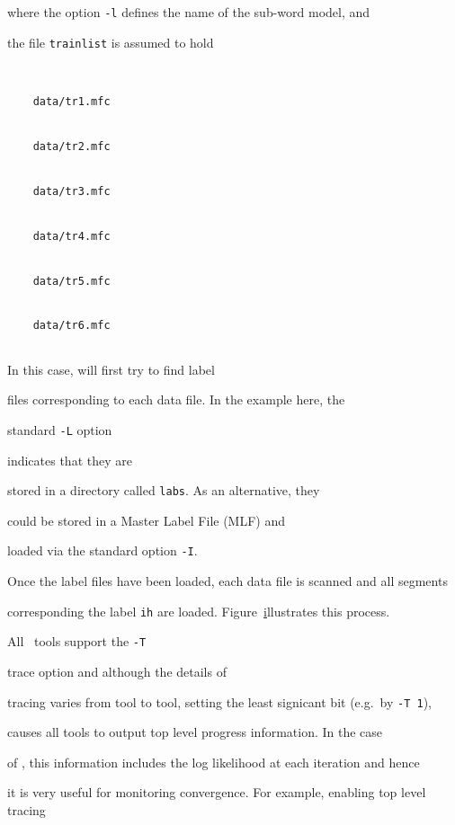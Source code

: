 where the option \texttt{-l} defines the name of the sub-word model, and 


the file \texttt{trainlist} is assumed to hold


\begin{verbatim}


    data/tr1.mfc


    data/tr2.mfc


    data/tr3.mfc


    data/tr4.mfc


    data/tr5.mfc


    data/tr6.mfc


\end{verbatim}


In this case,   will first try to find label




files corresponding to each data file.  In the example here, the 


standard \texttt{-L} option 


indicates that they are


stored in a directory called \texttt{labs}.  As an alternative, they


could be stored in a Master Label File (MLF) and 


loaded via the standard option \texttt{-I}.


Once the label files have been loaded, each data file is scanned and all segments


corresponding the label \texttt{ih} are loaded.  Figure~\href{f:hinitdp}


illustrates this process.





All \HTK\ tools support the \texttt{-T}


 trace option and although the details of 


tracing varies from tool to tool, setting the least signicant bit (e.g.\ by \texttt{-T 1}), 


causes all tools to output top level progress information.  In the case


of , this information includes the log likelihood at each iteration and hence


it is very useful for monitoring convergence.  For example, enabling top level tracing


